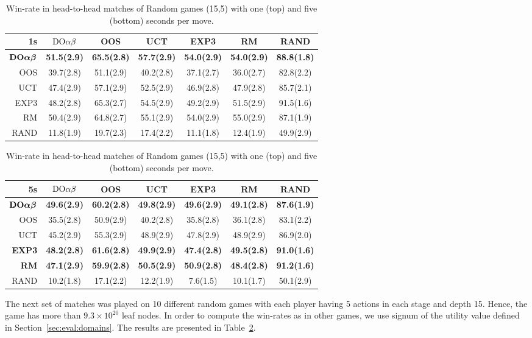 \begin{table}
\centering
\begin{scriptsize}
\begin{tabular}{|r|cccccc|}\hline
1s&$\textrm{DO}\alpha\beta$&OOS&UCT&EXP3&RM&RAND\\\hline
$\textrm{\bf DO}\boldsymbol{\alpha\beta}$&\textbf{51.5(2.9)}&\textbf{65.5(2.8)}&\textbf{57.7(2.9)}&\textbf{54.0(2.9)}&\textbf{54.0(2.9)}&\textbf{88.8(1.8)}\\
OOS&39.7(2.8)&51.1(2.9)&40.2(2.8)&37.1(2.7)&36.0(2.7)&82.8(2.2)\\
UCT&47.4(2.9)&57.1(2.9)&52.5(2.9)&46.9(2.8)&47.9(2.8)&85.7(2.1)\\
EXP3&48.2(2.8)&65.3(2.7)&54.5(2.9)&49.2(2.9)&51.5(2.9)&91.5(1.6)\\
RM&50.4(2.9)&64.8(2.7)&55.1(2.9)&54.0(2.9)&55.0(2.9)&87.1(1.9)\\
RAND&11.8(1.9)&19.7(2.3)&17.4(2.2)&11.1(1.8)&12.4(1.9)&49.9(2.9)\\
\hline
\end{tabular}
\begin{tabular}{|r|cccccc|}\hline
5s&$\textrm{DO}\alpha\beta$&OOS&UCT&EXP3&RM&RAND\\\hline
$\textrm{\bf DO}\boldsymbol{\alpha\beta}$&\textbf{49.6(2.9)}&\textbf{60.2(2.8)}&\textbf{49.8(2.9)}&\textbf{49.6(2.9)}&\textbf{49.1(2.8)}&\textbf{87.6(1.9)}\\
OOS&35.5(2.8)&50.9(2.9)&40.2(2.8)&35.8(2.8)&36.1(2.8)&83.1(2.2)\\
UCT&45.2(2.9)&55.3(2.9)&48.9(2.9)&47.8(2.9)&48.9(2.9)&86.9(2.0)\\
\textbf{EXP3}&\textbf{48.2(2.8)}&\textbf{61.6(2.8)}&\textbf{49.9(2.9)}&\textbf{47.4(2.8)}&\textbf{49.5(2.8)}&\textbf{91.0(1.6)}\\
\textbf{RM}&\textbf{47.1(2.9)}&\textbf{59.9(2.8)}&\textbf{50.5(2.9)}&\textbf{50.9(2.8)}&\textbf{48.4(2.8)}&\textbf{91.2(1.6)}\\
RAND&10.2(1.8)&17.1(2.2)&12.2(1.9)&7.6(1.5)&10.1(1.7)&50.1(2.9)\\
\hline
\end{tabular}

\end{scriptsize}
\caption{Win-rate in head-to-head matches of Random games (15,5) with one (top) and five (bottom) seconds per move.}\label{fig:matches:rand}
\end{table}


The next set of matches was played on 10 different random games with each player having 5 actions in each stage and depth 15. Hence, the game has more than $9.3\times 10^{20}$ leaf nodes. In order to compute the win-rates as in other games, we use signum of the utility value defined in Section~\ref{sec:eval:domains}. The results are presented in Table~\ref{fig:matches:rand}.

